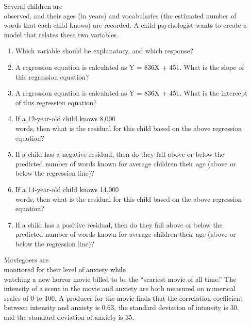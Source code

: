 \documentclass[11pt]{book}\usepackage[]{graphicx}\usepackage[]{color}
\begin{document}
\begin{exercises}
\begin{exercise}
Several children are \\ observed, and their ages (in years) and vocabularies (the estimated number of words that each child knows) are recorded. A child psychologist wants to create a model that relates these two variables.

\begin{enumerate}
  \item Which variable should be explanatory, and which response?
  \item A regression equation is calculated as Y = 836X + 451. What is the slope of this regression equation?
  \item A regression equation is calculated as Y = 836X + 451. What is the intercept of this regression equation?
  \item	If a 12-year-old child knows 8,000 \\ words, then what is the residual for this child based on the above regression \\ equation?
  \item	If a child has a negative residual, then do they fall above or below the \\ predicted number of words known for average children their age (above or below the regression line)?
  \item	If a 14-year-old child knows 14,000 \\ words, then what is the residual for this child based on the above regression \\ equation?
  \item	If a child has a positive residual, then do they fall above or below the \\ predicted number of words known for average children their age (above or below the regression line)?
\end{enumerate}

\end{exercise}
\begin{solution} %

\end{solution}

\begin{exercise} %

Moviegoers are \\ monitored for their level of anxiety while \\ watching a new horror movie billed to be the “scariest movie of all time.” The intensity of a scene in the movie and anxiety are both measured on numerical scales of 0 to 100. A producer for the movie finds that the correlation coefficient between intensity and anxiety is 0.63, the standard deviation of intensity is 30, and the standard deviation of anxiety is 35.


\end{exercise}
\end{exercises}
\end{document}
